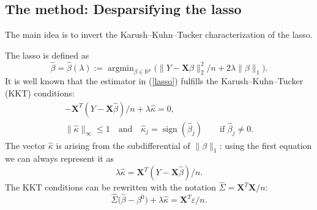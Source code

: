 \documentclass[aos,MSNbibl,dvips]{arximspdf}
\newcommand{\R}{\mathbb{R}}
\newcommand{\eps}{\varepsilon}
\newcommand{\bx}{\mathbf{X}}
\newcommand{\argmin}{\mathop{\arg\min}}
\begin{document}
\subsection{The method: Desparsifying the lasso}\label{subsecdespars}

The main idea is to invert the Karush--Kuhn--Tucker characterization of the
lasso.

The lasso \cite{tibs96} is defined as
%
\begin{equation}
\label{lasso} \hat{\beta} = \hat{\beta}(\lambda):= \argmin_{\beta\in\R^p} \bigl(
\|Y - \bx \beta\|_2^2/n + 2 \lambda\|\beta
\|_1\bigr).
\end{equation}
%
It is well known that the estimator in (\ref{lasso}) fulfills the
Karush--Kuhn--Tucker (KKT) conditions:
%
\begin{eqnarray*}
& - \bx^T (Y - \bx\hat{\beta})/n + \lambda\hat{\kappa} = 0,&
\\
& \|\hat{\kappa}\|_{\infty} \le1\quad \mbox{and}\quad \hat{\kappa}_j
= \operatorname {sign}(\hat{\beta}_j)\qquad \mbox{if $\hat{\beta}_j
\neq0$}.&
\end{eqnarray*}
%
The vector $\hat{\kappa}$ is arising from the subdifferential of
$\|\beta\|_1$: using the first equation we can always represent it as
%
\begin{equation}
\label{hattau} \lambda\hat{\kappa} = \bx^T(Y - \bx\hat{\beta})/n.
\end{equation}
%
The KKT conditions can be rewritten with the notation $\hat{\Sigma} =
\bx^T \bx/n $:
%
\[
\hat{\Sigma} \bigl(\hat{\beta}- \beta^0\bigr) + \lambda\hat{\kappa}
= \bx^T \eps/n.
\]
\end{document}
